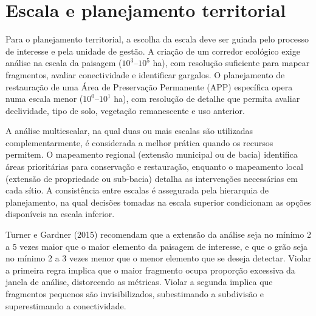 \documentclass[
  portuguese,
  11pt,
  a4paper,
  open=any]{scrbook}
\begin{document}
\section{Escala e planejamento
territorial}\label{escala-e-planejamento-territorial}

Para o planejamento territorial, a escolha da escala deve ser guiada
pelo processo de interesse e pela unidade de gestão. A criação de um
corredor ecológico exige análise na escala da paisagem
(\(10^3\)--\(10^5\) ha), com resolução suficiente para mapear
fragmentos, avaliar conectividade e identificar gargalos. O planejamento
de restauração de uma Área de Preservação Permanente (APP) específica
opera numa escala menor (\(10^0\)--\(10^1\) ha), com resolução de
detalhe que permita avaliar declividade, tipo de solo, vegetação
remanescente e uso anterior.

A análise multiescalar, na qual duas ou mais escalas são utilizadas
complementarmente, é considerada a melhor prática quando os recursos
permitem. O mapeamento regional (extensão municipal ou de bacia)
identifica áreas prioritárias para conservação e restauração, enquanto o
mapeamento local (extensão de propriedade ou sub-bacia) detalha as
intervenções necessárias em cada sítio. A consistência entre escalas é
assegurada pela hierarquia de planejamento, na qual decisões tomadas na
escala superior condicionam as opções disponíveis na escala inferior.

\begin{tcolorbox}[enhanced jigsaw, colbacktitle=quarto-callout-important-color!10!white, coltitle=black, opacityback=0, breakable, left=2mm, colback=white, bottomtitle=1mm, toptitle=1mm, titlerule=0mm, arc=.35mm, opacitybacktitle=0.6, leftrule=.75mm, colframe=quarto-callout-important-color-frame, title=\textcolor{quarto-callout-important-color}{\faExclamation}\hspace{0.5em}{Regra prática para escolha de escala}, rightrule=.15mm, bottomrule=.15mm, toprule=.15mm]

Turner e Gardner (2015) recomendam que a extensão da análise seja no
mínimo 2 a 5 vezes maior que o maior elemento da paisagem de interesse,
e que o grão seja no mínimo 2 a 3 vezes menor que o menor elemento que
se deseja detectar. Violar a primeira regra implica que o maior
fragmento ocupa proporção excessiva da janela de análise, distorcendo as
métricas. Violar a segunda implica que fragmentos pequenos são
invisibilizados, subestimando a subdivisão e superestimando a
conectividade.

\end{tcolorbox}
\end{document}

